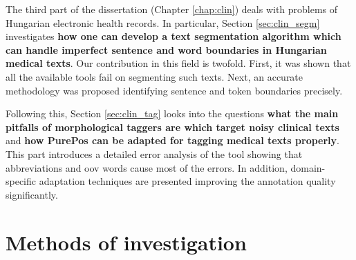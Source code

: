 The third part of the dissertation (Chapter \ref{chap:clin}) deals with problems of Hungarian electronic health records.
In particular, Section \ref{sec:clin_segm} investigates \textbf{how one can develop a text segmentation algorithm which can handle imperfect sentence and word boundaries in Hungarian medical texts}. 
Our contribution in this field is twofold. 
First, it was shown that all the available tools fail on segmenting such texts.
Next, an accurate methodology was proposed identifying sentence and token boundaries precisely.

Following this, Section \ref{sec:clin_tag} looks into the questions \textbf{what the main pitfalls of morphological taggers are which target noisy clinical texts} and \textbf{how PurePos can be adapted for tagging medical texts properly}.
This part introduces a detailed error analysis of the tool showing that abbreviations and \gls{oov} words cause most of the errors.
In addition, domain-specific adaptation techniques are presented improving the annotation quality significantly.



\section{Methods of investigation}

